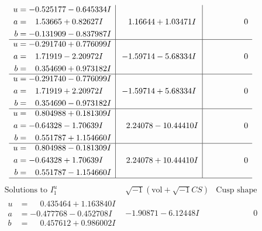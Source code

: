 \documentclass[1p]{elsarticle_modified}
\theoremstyle{definition}
\newcommand{\I}{\sqrt{-1}}
\begin{document}
$$\begin{array}{c|c|c}
\begin{aligned}
u &= -0.525177 - 0.645334 I \\
a &= \phantom{-}1.53665 + 0.82627 I \\
b &= -0.131909 - 0.837987 I\end{aligned}
 & \phantom{-}1.16644 + 1.03471 I & \phantom{-0.000000 } 0 \\ \hline\begin{aligned}
u &= -0.291740 + 0.776099 I \\
a &= \phantom{-}1.71919 - 2.20972 I \\
b &= \phantom{-}0.354690 + 0.973182 I\end{aligned}
 & -1.59714 - 5.68334 I & \phantom{-0.000000 } 0 \\ \hline\begin{aligned}
u &= -0.291740 - 0.776099 I \\
a &= \phantom{-}1.71919 + 2.20972 I \\
b &= \phantom{-}0.354690 - 0.973182 I\end{aligned}
 & -1.59714 + 5.68334 I & \phantom{-0.000000 } 0 \\ \hline\begin{aligned}
u &= \phantom{-}0.804988 + 0.181309 I \\
a &= -0.64328 - 1.70639 I \\
b &= \phantom{-}0.551787 + 1.154660 I\end{aligned}
 & \phantom{-}2.24078 - 10.44410 I & \phantom{-0.000000 } 0 \\ \hline\begin{aligned}
u &= \phantom{-}0.804988 - 0.181309 I \\
a &= -0.64328 + 1.70639 I \\
b &= \phantom{-}0.551787 - 1.154660 I\end{aligned}
 & \phantom{-}2.24078 + 10.44410 I & \phantom{-0.000000 } 0\\
 \hline 
 \end{array}$$\newpage$$\begin{array}{c|c|c}  
\text{Solutions to }I^u_{1}& \I (\text{vol} + \sqrt{-1}CS) & \text{Cusp shape}\\
 \hline 
\begin{aligned}
u &= \phantom{-}0.435464 + 1.163840 I \\
a &= -0.477768 - 0.452708 I \\
b &= \phantom{-}0.457612 + 0.986002 I\end{aligned}
 & -1.90871 - 6.12448 I & \phantom{-0.000000 } 0 \\ \hline\begin{aligned}

\end{aligned}
\end{array}$$
\end{document}

